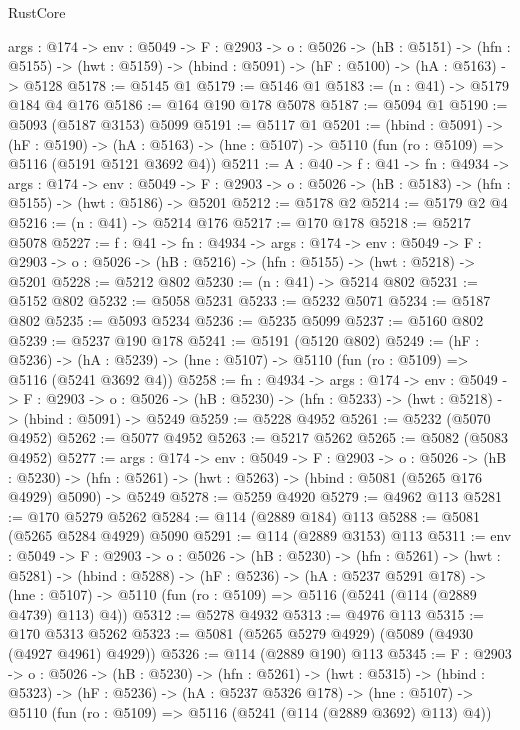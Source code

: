 \begin{lexlean}{RustCore}
\begin{coremodule}
  {args : @174} ->
  {env : @5049} ->
  {F : @2903} ->
  {o : @5026} ->
  (hB : @5151) ->
  (hfn : @5155) -> (hwt : @5159) -> (hbind : @5091) -> (hF : @5100) -> (hA : @5163) -> @5128
@5178 := @5145 @1
@5179 := @5146 @1
@5183 := (n : @41) -> @5179 @184 @4 @176
@5186 := @164 @190 @178 @5078
@5187 := @5094 @1
@5190 := @5093 (@5187 @3153) @5099
@5191 := @5117 @1
@5201 := (hbind : @5091) ->
  (hF : @5190) ->
  (hA : @5163) -> (hne : @5107) -> @5110 (fun (ro : @5109) => @5116 (@5191 @5121 @3692 @4))
@5211 := {A : @40} ->
  {f : @41} ->
  {fn : @4934} ->
  {args : @174} ->
  {env : @5049} ->
  {F : @2903} -> {o : @5026} -> (hB : @5183) -> (hfn : @5155) -> (hwt : @5186) -> @5201
@5212 := @5178 @2
@5214 := @5179 @2 @4
@5216 := (n : @41) -> @5214 @176
@5217 := @170 @178
@5218 := @5217 @5078
@5227 := {f : @41} ->
  {fn : @4934} ->
  {args : @174} ->
  {env : @5049} ->
  {F : @2903} -> {o : @5026} -> (hB : @5216) -> (hfn : @5155) -> (hwt : @5218) -> @5201
@5228 := @5212 @802
@5230 := (n : @41) -> @5214 @802
@5231 := @5152 @802
@5232 := @5058 @5231
@5233 := @5232 @5071
@5234 := @5187 @802
@5235 := @5093 @5234
@5236 := @5235 @5099
@5237 := @5160 @802
@5239 := @5237 @190 @178
@5241 := @5191 (@5120 @802)
@5249 := (hF : @5236) ->
  (hA : @5239) -> (hne : @5107) -> @5110 (fun (ro : @5109) => @5116 (@5241 @3692 @4))
@5258 := {fn : @4934} ->
  {args : @174} ->
  {env : @5049} ->
  {F : @2903} ->
  {o : @5026} -> (hB : @5230) -> (hfn : @5233) -> (hwt : @5218) -> (hbind : @5091) -> @5249
@5259 := @5228 @4952
@5261 := @5232 (@5070 @4952)
@5262 := @5077 @4952
@5263 := @5217 @5262
@5265 := @5082 (@5083 @4952)
@5277 := {args : @174} ->
  {env : @5049} ->
  {F : @2903} ->
  {o : @5026} ->
  (hB : @5230) ->
  (hfn : @5261) -> (hwt : @5263) -> (hbind : @5081 (@5265 @176 @4929) @5090) -> @5249
@5278 := @5259 @4920
@5279 := @4962 @113
@5281 := @170 @5279 @5262
@5284 := @114 (@2889 @184) @113
@5288 := @5081 (@5265 @5284 @4929) @5090
@5291 := @114 (@2889 @3153) @113
@5311 := {env : @5049} ->
  {F : @2903} ->
  {o : @5026} ->
  (hB : @5230) ->
  (hfn : @5261) ->
  (hwt : @5281) ->
  (hbind : @5288) ->
  (hF : @5236) ->
  (hA : @5237 @5291 @178) ->
  (hne : @5107) -> @5110 (fun (ro : @5109) => @5116 (@5241 (@114 (@2889 @4739) @113) @4))
@5312 := @5278 @4932
@5313 := @4976 @113
@5315 := @170 @5313 @5262
@5323 := @5081 (@5265 @5279 @4929) (@5089 (@4930 (@4927 @4961) @4929))
@5326 := @114 (@2889 @190) @113
@5345 := {F : @2903} ->
  {o : @5026} ->
  (hB : @5230) ->
  (hfn : @5261) ->
  (hwt : @5315) ->
  (hbind : @5323) ->
  (hF : @5236) ->
  (hA : @5237 @5326 @178) ->
  (hne : @5107) -> @5110 (fun (ro : @5109) => @5116 (@5241 (@114 (@2889 @3692) @113) @4))

\end{coremodule}
\end{lexlean}
